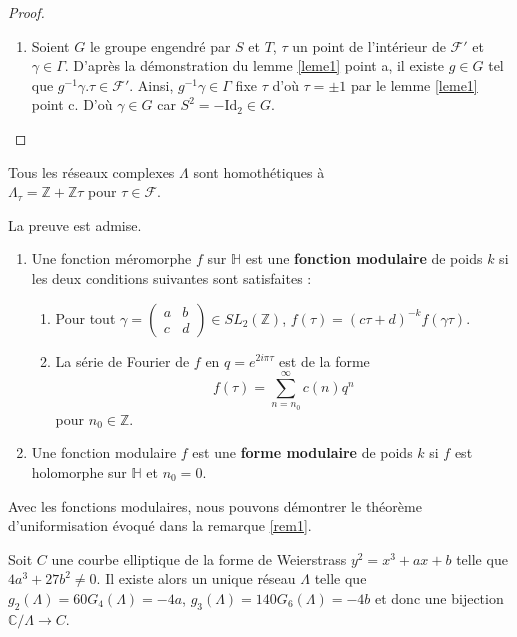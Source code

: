 \documentclass[a4paper]{article}
\begin{document}
\begin{proof}
\begin{enumerate}
\item 
Soient $G$ le groupe engendré par $S$ et $T$, $\tau$ un point de l'intérieur de $\mathcal{F}'$ et $\gamma \in \Gamma$. D'après la démonstration du lemme \ref{leme1} point a, il existe $g \in G$ tel que $g^{-1}\gamma.\tau \in \mathcal{F}'$. Ainsi, $g^{-1}\gamma \in \Gamma$ fixe $\tau$ d'où $\tau=\pm 1$ par le lemme \ref{leme1} point c. D'où $\gamma \in G$ car $S^2=-\text{Id}_2 \in G$.
\end{enumerate}
\end{proof}

\begin{cor}
Tous les réseaux complexes $\Lambda$ sont homothétiques à\\$\Lambda_\tau=\mathbb{Z}+\mathbb{Z}\tau$ pour $\tau \in \mathcal{F}$.

\end{cor}
\noindent La preuve est admise.
\begin{definition}
\begin{enumerate}
\item
Une fonction méromorphe $f$ sur $\mathbb{H}$ est une \textbf{fonction modulaire} de poids $k$ si les deux conditions suivantes sont satisfaites : 
\begin{enumerate}
\item Pour tout $\gamma=\begin{pmatrix} 
a & b \\
c & d 
\end{pmatrix} \in SL_{2}(\mathbb{Z})$, $f(\tau)=(c\tau+d)^{-k}f(\gamma\tau)$.
\item La série de Fourier de $f$ en $q=e^{2i\pi\tau}$ est de la forme
\begin{equation*}
f(\tau)=\sum \limits_{n=n_{0}}^\infty c(n)q^n
\end{equation*}
pour $n_{0} \in \mathbb{Z}$.
\end{enumerate}
\item Une fonction modulaire $f$ est une \textbf{forme modulaire} de poids $k$ si $f$ est holomorphe sur $\mathbb{H}$ et $n_{0}=0$.
\end{enumerate}
\end{definition}

\noindent Avec les fonctions modulaires, nous pouvons démontrer le théorème d'uniformisation évoqué dans la remarque \ref{rem1}. 

\begin{theorem}
Soit $C$ une courbe elliptique de la forme de Weierstrass $y^2=x^3+ax+b$ telle que $4a^3+27b^2 \neq 0$. Il existe alors un unique réseau $\Lambda$ telle que $g_{2}(\Lambda)=60G_{4}(\Lambda)=-4a$, $g_{3}(\Lambda)=140G_{6}(\Lambda)=-4b$ et donc une bijection $\mathbb{C}/\Lambda \rightarrow C$.
\end{theorem}
\end{document}
